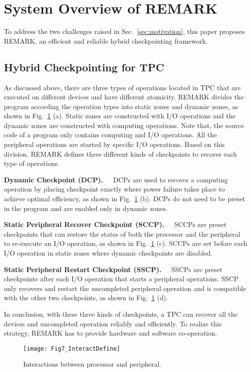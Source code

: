\section{System Overview of REMARK} \label{sec:system}
%
To address the two challenges raised in Sec.~\ref{sec:motivation}, this paper proposes REMARK, an efficient and reliable hybrid checkpointing framework. 

\subsection{Hybrid Checkpointing for TPC}   \label{sec:sysHybridCP}
%
As discussed above, there are three types of operations located in TPC that are executed on different devices and have different atomicity.
REMARK divides the program according the operation types into static zones and dynamic zones, as shown in Fig.~\ref{fig:InteractDefine} (a).
Static zones are constructed with I/O operations and the dynamic zones are constructed with computing operations.
Note that, the source code of a program only contains computing and I/O operations. 
All the peripheral operations are started by specific I/O operations.
Based on this division, REMARK defines three different kinds of checkpoints to recover each type of operations.

\noindent\textbf{Dynamic Checkpoint (DCP).\ \ }
%
DCPs are used to recover a computing operation by placing checkpoint exactly where power failure takes place to achieve optimal efficiency, as shown in Fig.~\ref{fig:InteractDefine} (b).
DCPs do not need to be preset in the program and are enabled only in dynamic zones.

\noindent\textbf{Static Peripheral Recover Checkpoint (SCCP).\ \ }
%
SCCPs are preset checkpoints that can restore the states of both the processor and the peripheral to re-execute an I/O operation, as shown in Fig.~\ref{fig:InteractDefine} (c).
SCCPs are set before each I/O operation in static zones where dynamic checkpoints are disabled.

\noindent\textbf{Static Peripheral Restart Checkpoint (SSCP).\ \ }
SSCPs are preset checkpoints after each I/O operation that starts a peripheral operations.
SSCP only recovers and restart the uncompleted peripheral operation and is compatible with the other two checkpoints, as shown in Fig.~\ref{fig:InteractDefine} (d).

In conclusion, with these three kinds of checkpoints, a TPC can recover all the devices and uncompleted operation reliably and efficiently. 
To realize this strategy, REMARK has to provide hardware and software co-operation.
%   
\begin{figure}[t]
    \centering
    \texttt{[image: Fig7\_InteractDefine]}
    \caption{Interactions between processor and peripheral.}
    \label{fig:InteractDefine}
\end{figure}

